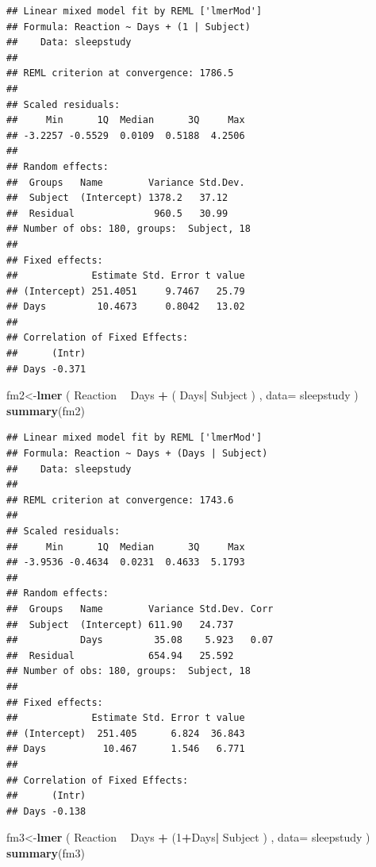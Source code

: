 \documentclass[]{book}
\newenvironment{Shaded}{\begin{snugshade}}{\end{snugshade}}
\newcommand{\KeywordTok}[1]{\textcolor[rgb]{0.13,0.29,0.53}{\textbf{#1}}}
\newcommand{\DataTypeTok}[1]{\textcolor[rgb]{0.13,0.29,0.53}{#1}}
\newcommand{\DecValTok}[1]{\textcolor[rgb]{0.00,0.00,0.81}{#1}}
\newcommand{\StringTok}[1]{\textcolor[rgb]{0.31,0.60,0.02}{#1}}
\newcommand{\OperatorTok}[1]{\textcolor[rgb]{0.81,0.36,0.00}{\textbf{#1}}}
\newcommand{\NormalTok}[1]{#1}
\begin{document}
\begin{verbatim}
## Linear mixed model fit by REML ['lmerMod']
## Formula: Reaction ~ Days + (1 | Subject)
##    Data: sleepstudy
## 
## REML criterion at convergence: 1786.5
## 
## Scaled residuals: 
##     Min      1Q  Median      3Q     Max 
## -3.2257 -0.5529  0.0109  0.5188  4.2506 
## 
## Random effects:
##  Groups   Name        Variance Std.Dev.
##  Subject  (Intercept) 1378.2   37.12   
##  Residual              960.5   30.99   
## Number of obs: 180, groups:  Subject, 18
## 
## Fixed effects:
##             Estimate Std. Error t value
## (Intercept) 251.4051     9.7467   25.79
## Days         10.4673     0.8042   13.02
## 
## Correlation of Fixed Effects:
##      (Intr)
## Days -0.371
\end{verbatim}

\begin{Shaded}
\begin{Highlighting}[]
\NormalTok{fm2<-}\KeywordTok{lmer}\NormalTok{ ( Reaction }\OperatorTok{~}\StringTok{ }\NormalTok{Days }\OperatorTok{+}\StringTok{ }\NormalTok{( Days}\OperatorTok{|}\StringTok{ }\NormalTok{Subject ) , }\DataTypeTok{data=}\NormalTok{ sleepstudy )}
\KeywordTok{summary}\NormalTok{(fm2)}
\end{Highlighting}
\end{Shaded}

\begin{verbatim}
## Linear mixed model fit by REML ['lmerMod']
## Formula: Reaction ~ Days + (Days | Subject)
##    Data: sleepstudy
## 
## REML criterion at convergence: 1743.6
## 
## Scaled residuals: 
##     Min      1Q  Median      3Q     Max 
## -3.9536 -0.4634  0.0231  0.4633  5.1793 
## 
## Random effects:
##  Groups   Name        Variance Std.Dev. Corr
##  Subject  (Intercept) 611.90   24.737       
##           Days         35.08    5.923   0.07
##  Residual             654.94   25.592       
## Number of obs: 180, groups:  Subject, 18
## 
## Fixed effects:
##             Estimate Std. Error t value
## (Intercept)  251.405      6.824  36.843
## Days          10.467      1.546   6.771
## 
## Correlation of Fixed Effects:
##      (Intr)
## Days -0.138
\end{verbatim}

\begin{Shaded}
\begin{Highlighting}[]
\NormalTok{fm3<-}\KeywordTok{lmer}\NormalTok{ ( Reaction }\OperatorTok{~}\StringTok{ }\NormalTok{Days }\OperatorTok{+}\StringTok{ }\NormalTok{(}\DecValTok{1}\OperatorTok{+}\NormalTok{Days}\OperatorTok{|}\StringTok{ }\NormalTok{Subject ) , }\DataTypeTok{data=}\NormalTok{ sleepstudy )}
\KeywordTok{summary}\NormalTok{(fm3)}
\end{Highlighting}
\end{Shaded}
\end{document}
